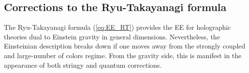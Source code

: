 \documentclass[twocolumn]{revtex4}
\providecommand{\eq}[2]{
    \begin{equation}
        #2
    \label{eq:#1}
    \end{equation}
}
\begin{document}



\subsection{Corrections to the Ryu-Takayanagi formula} \label{ss:EE_HO}

The Ryu-Takayanagi formula (\ref{eq:EE_RT}) provides the EE for holographic theories dual to Einstein gravity in general dimensions. Nevertheless, the Einsteinian description breaks down if one moves away from the strongly coupled and large-number of colors regime. From the gravity side, this is manifest in the appearance of both stringy and quantum corrections. %
\end{document}
